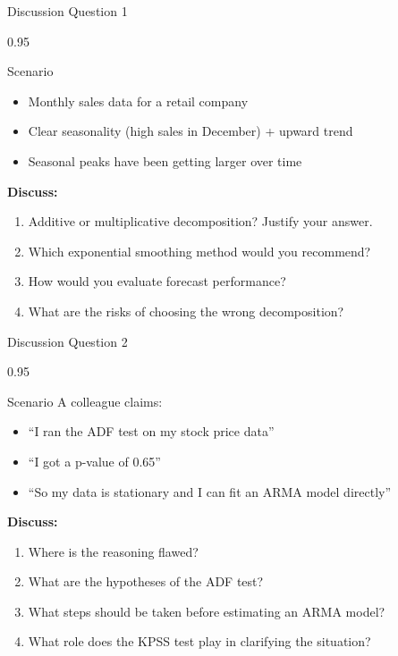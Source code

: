 \documentclass[9pt, aspectratio=169, t]{beamer}
\begin{document}
\begin{frame}{Discussion Question 1}
    \begin{cminipage}{0.95\textwidth}
    \begin{block}{Scenario}
        \begin{itemize}\setlength{\itemsep}{1pt}
            \item Monthly sales data for a retail company
            \item Clear seasonality (high sales in December) + upward trend
            \item Seasonal peaks have been getting larger over time
        \end{itemize}
    \end{block}

    \vspace{0.4cm}

    \textbf{Discuss:}
    \begin{enumerate}
        \item Additive or multiplicative decomposition? Justify your answer.
        \item Which exponential smoothing method would you recommend?
        \item How would you evaluate forecast performance?
        \item What are the risks of choosing the wrong decomposition?
    \end{enumerate}
    \end{cminipage}
\end{frame}

\begin{frame}{Discussion Question 2}
    \begin{cminipage}{0.95\textwidth}
    \begin{block}{Scenario}
        A colleague claims:
        \begin{itemize}\setlength{\itemsep}{1pt}
            \item ``I ran the ADF test on my stock price data''
            \item ``I got a p-value of 0.65''
            \item ``So my data is stationary and I can fit an ARMA model directly''
        \end{itemize}
    \end{block}

    \vspace{0.4cm}

    \textbf{Discuss:}
    \begin{enumerate}
        \item Where is the reasoning flawed?
        \item What are the hypotheses of the ADF test?
        \item What steps should be taken before estimating an ARMA model?
        \item What role does the KPSS test play in clarifying the situation?
    \end{enumerate}
    \end{cminipage}
\end{frame}
\end{document}
